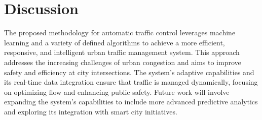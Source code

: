 \documentclass[usenatbib]{tjaa}
\begin{document}
\section[]{Discussion}
The proposed methodology for automatic traffic control leverages machine learning and a variety of defined algorithms to achieve a more efficient, responsive, and intelligent urban traffic management system.
         This approach addresses the increasing challenges of urban congestion and aims to improve safety and efficiency at city intersections. The system's adaptive capabilities and its real-time data integration ensure that traffic is managed dynamically, focusing on optimizing flow and enhancing public safety. Future work will involve expanding the system's capabilities to include more advanced predictive analytics and exploring its 
integration with smart city initiatives.
\end{document}
